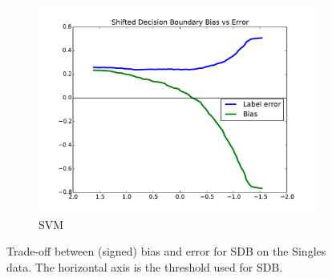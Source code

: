 \documentclass[twoside,leqno,twocolumn]{article}
\begin{document}
\begin{figure}[t]
\begin{subfigure}{.7\columnwidth}
\includegraphics[width=\columnwidth]{images/singles-svm-T.pdf}%
\caption{SVM}%
\label{fig:singles_svm_tradeoff}%
\end{subfigure}%
\caption{Trade-off between (signed) bias and error for SDB on the Singles data. The horizontal axis is the threshold used for SDB.}
\label{fig:singles_tradeoffs}
\end{figure}




\clearpage
\appendix
\end{document}
